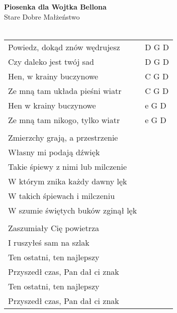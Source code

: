 \documentclass[a5paper]{article}
\begin{document}


\noindent
\fontsize{12pt}{15pt}\selectfont
\textbf{Piosenka dla Wojtka Bellona} \\
\fontsize{8pt}{10pt}\selectfont
Stare Dobre Małżeństwo \\ \\
\fontsize{10pt}{12pt}\selectfont
{}
\begin{tabular}{@{}p{7.50cm}p{3cm}@{}}
\noindent
Powiedz, dokąd znów wędrujesz & D G D \\
Czy daleko jest twój sad & D G D \\
Hen, w krainy buczynowe & C G D \\
Ze mną tam układa pieśni wiatr & C G D \\
Hen w krainy buczynowe & e G D \\
Ze mną tam nikogo, tylko wiatr & e G D \\ \\
 
Zmierzchy grają, a przestrzenie\\
Własny mi podają dźwięk\\
Takie śpiewy z nimi lub milczenie\\
W którym znika każdy dawny lęk\\
W takich śpiewach i milczeniu\\
W szumie świętych buków zginął lęk\\\\
 
Zaszumiały Cię powietrza\\
I ruszyłeś sam na szlak\\
Ten ostatni, ten najlepszy\\
Przyszedł czas, Pan dał ci znak\\
Ten ostatni, ten najlepszy\\
Przyszedł czas, Pan dał ci znak
\end{tabular}
\end{document}

